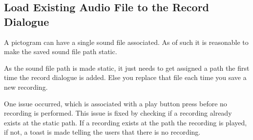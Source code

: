 \subsection{Load Existing Audio File to the Record Dialogue}
A pictogram can have a single sound file associated.
As of such it is reasonable to make the saved sound file path static.

As the sound file path is made static, it just needs to get assigned a path the first time the record dialogue is added. 
Else you replace that file each time you save a new recording.

One issue occurred, which is associated with a play button press before no recording is performed.
This issue is fixed by checking if a recording already exists at the static path. If a recording exists at the path the recording is played, if not, a toast is made telling the users that there is no recording.